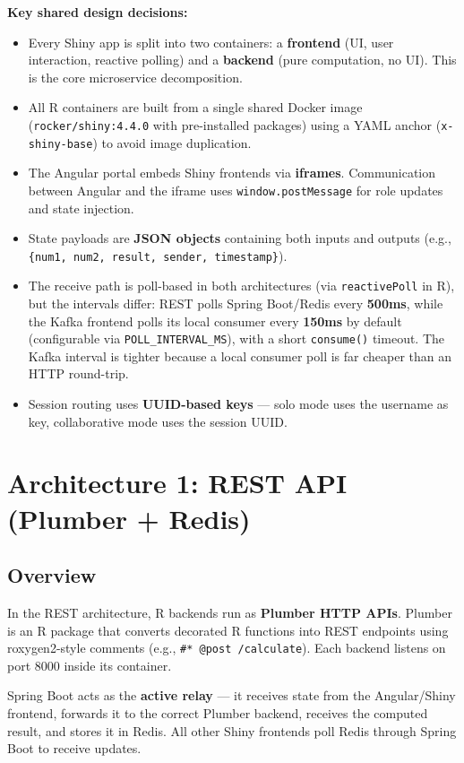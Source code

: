 \documentclass[12pt,a4paper]{article}
\begin{document}
\textbf{Key shared design decisions:}
\begin{itemize}[nosep]
  \item Every Shiny app is split into two containers: a \textbf{frontend} (UI, user interaction, reactive polling) and a \textbf{backend} (pure computation, no UI). This is the core microservice decomposition.
  \item All R containers are built from a single shared Docker image (\texttt{rocker/shiny:4.4.0} with pre-installed packages) using a YAML anchor (\texttt{x-shiny-base}) to avoid image duplication.
  \item The Angular portal embeds Shiny frontends via \textbf{iframes}. Communication between Angular and the iframe uses \texttt{window.postMessage} for role updates and state injection.
  \item State payloads are \textbf{JSON objects} containing both inputs and outputs (e.g., \texttt{\{num1, num2, result, sender, timestamp\}}).
  \item The receive path is poll-based in both architectures (via \texttt{reactivePoll} in R), but the intervals differ: REST polls Spring Boot/Redis every \textbf{500ms}, while the Kafka frontend polls its local consumer every \textbf{150ms} by default (configurable via \texttt{POLL\_INTERVAL\_MS}), with a short \texttt{consume()} timeout. The Kafka interval is tighter because a local consumer poll is far cheaper than an HTTP round-trip.
  \item Session routing uses \textbf{UUID-based keys} --- solo mode uses the username as key, collaborative mode uses the session UUID.
\end{itemize}

\section{Architecture 1: REST API (Plumber + Redis)}

\subsection{Overview}

In the REST architecture, R backends run as \textbf{Plumber HTTP APIs}. Plumber is an R package that converts decorated R functions into REST endpoints using roxygen2-style comments (e.g., \texttt{\#* @post /calculate}). Each backend listens on port 8000 inside its container.

Spring Boot acts as the \textbf{active relay} --- it receives state from the Angular/Shiny frontend, forwards it to the correct Plumber backend, receives the computed result, and stores it in Redis. All other Shiny frontends poll Redis through Spring Boot to receive updates.
\end{document}
